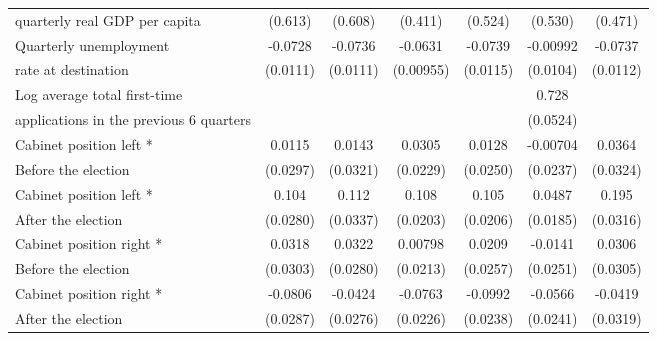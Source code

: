 \begin{table}[htbp]
\begin{tabular}{l*{6}{c}}
quarterly real GDP per capita                    &     (0.613)         &     (0.608)         &     (0.411)         &     (0.524)         &     (0.530)         &     (0.471)         \\
[0.5em]
Quarterly unemployment &     -0.0728\sym{***}&     -0.0736\sym{***}&     -0.0631\sym{***}&     -0.0739\sym{***}&    -0.00992         &     -0.0737\sym{***}\\
rate at destination                    &    (0.0111)         &    (0.0111)         &   (0.00955)         &    (0.0115)         &    (0.0104)         &    (0.0112)         \\
[0.5em]
Log average total first-time &                     &                     &                     &                     &       0.728\sym{***}&                     \\
applications in the previous 6 quarters                    &                     &                     &                     &                     &    (0.0524)         &                     \\
[0.5em]
Cabinet position left * &      0.0115         &      0.0143         &      0.0305         &      0.0128         &    -0.00704         &      0.0364         \\
Before the election                    &    (0.0297)         &    (0.0321)         &    (0.0229)         &    (0.0250)         &    (0.0237)         &    (0.0324)         \\
[0.5em]
Cabinet position left * &       0.104\sym{***}&       0.112\sym{***}&       0.108\sym{***}&       0.105\sym{***}&      0.0487\sym{*}  &       0.195\sym{***}\\
After the election                    &    (0.0280)         &    (0.0337)         &    (0.0203)         &    (0.0206)         &    (0.0185)         &    (0.0316)         \\
[0.5em]
Cabinet position right * &      0.0318         &      0.0322         &     0.00798         &      0.0209         &     -0.0141         &      0.0306         \\
Before the election                   &    (0.0303)         &    (0.0280)         &    (0.0213)         &    (0.0257)         &    (0.0251)         &    (0.0305)         \\
[0.5em]
Cabinet position right * &     -0.0806\sym{**} &     -0.0424         &     -0.0763\sym{**} &     -0.0992\sym{***}&     -0.0566\sym{*}  &     -0.0419         \\
After the election                    &    (0.0287)         &    (0.0276)         &    (0.0226)         &    (0.0238)         &    (0.0241)         &    (0.0319)         \\

\end{tabular}
\end{table}

